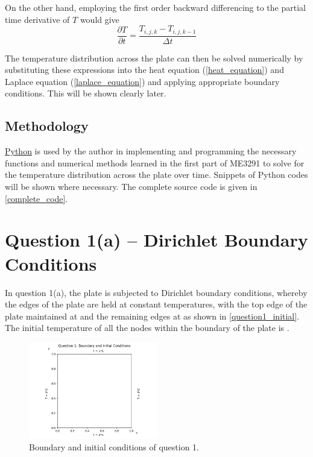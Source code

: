 \documentclass[a4paper]{article}
\begin{document}
		On the other hand, employing the first order backward differencing to the partial time derivative of $T$ would give
		\begin{equation}
			\frac{\partial T}{\partial t} = \frac{T_{i,j,k} - T_{i,j,k-1}}{\Delta t}
			\label{time_backward_differencing}
		\end{equation}
		
		The temperature distribution across the plate can then be solved numerically by substituting these expressions into the heat equation (\autoref{heat_equation}) and Laplace equation (\autoref{laplace_equation}) and applying appropriate boundary conditions. This will be shown clearly later.
		
	\subsection{Methodology}
		\href{https://en.wikipedia.org/wiki/Python_(programming_language)}{Python} is used by the author in implementing and programming the necessary functions and numerical methods learned in the first part of ME3291 to solve for the temperature distribution across the plate over time. Snippets of Python codes will be shown where necessary. The complete source code is given in \autoref{complete_code}.

\section{Question 1(a) -- Dirichlet Boundary Conditions}
	In question 1(a), the plate is subjected to Dirichlet boundary conditions, whereby the edges of the plate are held at constant temperatures, with the top edge of the plate maintained at  and the remaining edges at  as shown in \autoref{question1_initial}. The initial temperature of all the nodes within the boundary of the plate is .
	\begin{figure}[H]
		\centering
		\includegraphics[width=0.5\textwidth]{figures/question1_initial}
		\caption{Boundary and initial conditions of question 1.}
		\label{question1_initial}
	\end{figure}
	
\end{document}
